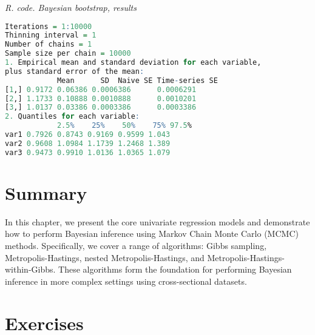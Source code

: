 \begin{tcolorbox}[enhanced,width=4.67in,center upper,
	fontupper=\large\bfseries,drop shadow southwest,sharp corners]
	\textit{R. code. Bayesian bootstrap, results}
	\begin{VF}
		\begin{lstlisting}[language=R]
Iterations = 1:10000
Thinning interval = 1 
Number of chains = 1 
Sample size per chain = 10000 
1. Empirical mean and standard deviation for each variable,
plus standard error of the mean:
			Mean      SD  Naive SE Time-series SE
[1,] 0.9172 0.06386 0.0006386      0.0006291
[2,] 1.1733 0.10888 0.0010888      0.0010201
[3,] 1.0137 0.03386 0.0003386      0.0003386
2. Quantiles for each variable:
			2.5%    25%    50%    75% 97.5%
var1 0.7926 0.8743 0.9169 0.9599 1.043
var2 0.9608 1.0984 1.1739 1.2468 1.389
var3 0.9473 0.9910 1.0136 1.0365 1.079
\end{lstlisting}
	\end{VF}
\end{tcolorbox} 


\section{Summary}\label{sec611}
In this chapter, we present the core univariate regression models and demonstrate how to perform Bayesian inference using Markov Chain Monte Carlo (MCMC) methods. Specifically, we cover a range of algorithms: Gibbs sampling, Metropolis-Hastings, nested Metropolis-Hastings, and Metropolis-Hastings-within-Gibbs. These algorithms form the foundation for performing Bayesian inference in more complex settings using cross-sectional datasets.

\section{Exercises}\label{sec612}


